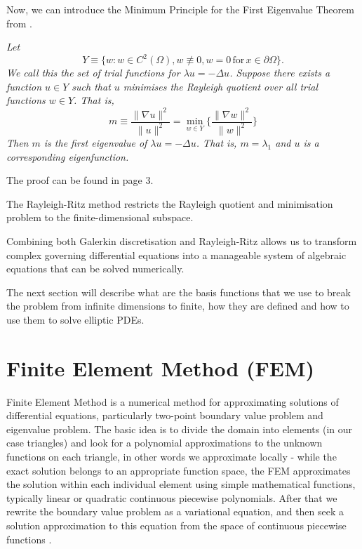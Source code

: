 \documentclass[conference]{IEEEtran}
\begin{document}
Now, we can introduce the Minimum Principle for the First Eigenvalue Theorem from \cite{b0} \cite{b9.1}.

\textit{
    Let
    \begin{equation}
        Y \equiv \{w: w \in C^2(\Omega), w \not\equiv 0, w = 0 \, \text{for} \, x \in \partial\Omega\}.
    \end{equation}
    We call this the set of trial functions for $\lambda u = -\Delta u$. Suppose there exists a function $u \in Y$ such that $u$ minimises the Rayleigh quotient over all trial functions $w \in Y$.
    That is,
    \begin{equation}
        m \equiv \frac{\|\nabla u\|^2}{\|u\|^2} = \min_{w \in Y} \Bigg\{\frac{\|\nabla w\|^2}{\|w\|^2} \Bigg\}
    \end{equation}
    Then $m$ is the first eigenvalue of $\lambda u = -\Delta u$. That is, $m = \lambda_1$ and $u$ is a corresponding eigenfunction.
}

The proof can be found in \cite{b9.1} page 3.

The Rayleigh-Ritz method restricts the Rayleigh quotient and minimisation problem to the finite-dimensional subspace.

Combining both Galerkin discretisation and Rayleigh-Ritz allows us to transform complex governing differential equations into a manageable system of algebraic equations that can be solved numerically.

The next section will describe what are the basis functions that we use to break the problem from infinite dimensions to finite, how they are defined and how to use them to solve elliptic PDEs.



\section{Finite Element Method (FEM)}

Finite Element Method is a numerical method for approximating solutions of differential equations, particularly two-point boundary value problem and eigenvalue problem. The basic idea is to divide the domain into elements (in our case triangles) and look for a polynomial approximations to the unknown functions on each triangle, 
in other words we approximate locally - while the exact solution belongs to an appropriate function space, the FEM approximates the solution within each individual element using simple mathematical functions, typically linear or quadratic continuous piecewise polynomials. 
After that we rewrite the boundary value problem as a variational equation, and then seek a solution approximation to this equation from the space of continuous piecewise functions \cite{b10}.
\end{document}
